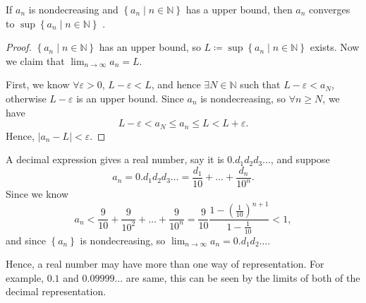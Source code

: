 \begin{theorem}\label{thm: converge sup}
    If \(a_n\) is nondecreasing and \(\left\{ a_n \mid n \in \mathbb{N}  \right\} \) has a upper bound, then  \(a_n\) converges to \(\sup \left\{ a_n \mid n \in \mathbb{N} \right\} \) . 
\end{theorem}
\begin{proof}
    \(\left\{ a_n \mid n \in \mathbb{N} \right\} \) has an upper bound, so \(L \coloneqq  \sup \left\{ a_n \mid n \in \mathbb{N}  \right\} \) exists. Now we claim that \(\lim_{n \to \infty} a_n = L \). 

    First, we know \(\forall \varepsilon > 0\), \(L - \varepsilon < L\), and hence \(\exists N \in \mathbb{N} \) such that \(L - \varepsilon < a_N\), otherwise \(L - \varepsilon \) is an upper bound. Since \(a_n\) is nondecreasing, so \(\forall n \ge N\), we have
    \[
        L - \varepsilon < a_N \le a_n \le L < L + \varepsilon.
    \]
    Hence, \(\left\vert a_n - L \right\vert < \varepsilon  \). 
\end{proof}

\begin{eg}
    A decimal expression gives a real number, say it is \(0.d_1 d_2 d_3 \dots \), and suppose
    \[
        a_n = 0. d_1 d_2 d_3 \dots = \frac{d_1}{10} + \dots + \frac{d_n}{10^n}.
    \]
    Since we know
    \[
        a_n < \frac{9}{10} + \frac{9}{10^2} + \dots + \frac{9}{10^n} = \frac{9}{10}\frac{1 - \left( \frac{1}{10} \right)^{n+1}}{1 - \frac{1}{10}} < 1,
    \] and since \(\left\{ a_n \right\} \) is nondecreasing, so \(\lim_{n \to \infty} a_n = 0.d_1 d_2 \dots \). 
\end{eg}

\begin{note}
    Hence, a real number may have more than one way of representation. For example, \(0.1\) and \(0.09999\dots \) are same, this can be seen by the limits of both of the decimal representation.    
\end{note}

